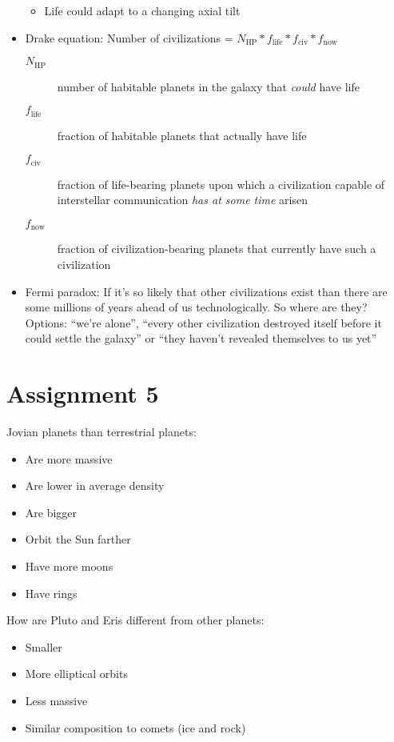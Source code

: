 \documentclass[12pt]{article}
\begin{document}
\begin{itemize}
\begin{itemize}
        \item Life could adapt to a changing axial tilt
    \end{itemize}
    \item Drake equation: Number of civilizations = $N_\text{HP} * f_\text{life} * f_\text{civ} * f_\text{now}$
    \begin{description}
        \item[$N_\text{HP}$] number of habitable planets in the galaxy that \emph{could} have life
        \item[$f_\text{life}$] fraction of habitable planets that actually have life
        \item[$f_\text{civ}$] fraction of life-bearing planets upon which a civilization capable of interstellar communication \emph{has at some time} arisen
        \item[$f_\text{now}$] fraction of civilization-bearing planets that currently have such a civilization
    \end{description}
    \item Fermi paradox: If it's so likely that other civilizations exist than there are some millions of years ahead of us technologically.  So where are they?  Options: ``we're alone'', ``every other civilization destroyed itself before it could settle the galaxy'' or ``they haven't revealed themselves to us yet''
\end{itemize}

\section{Assignment 5}


Jovian planets \underline{\hspace{5em}} than terrestrial planets:
\begin{itemize}
    \item Are more massive 
    \item Are lower in average density 
    \item Are bigger 
    \item Orbit the Sun farther 
    \item Have more moons
    \item Have rings
\end{itemize}

How are Pluto and Eris different from other planets:
\begin{itemize}
    \item Smaller
    \item More elliptical orbits
    \item Less massive
    \item Similar composition to comets (ice and rock)
\end{itemize}
\end{document}
